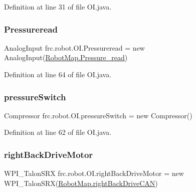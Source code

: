 Definition at line 31 of file O\+I.\+java.

\mbox{\label{classfrc_1_1robot_1_1_o_i_a763d5acad9b29d4b29b0fff838059571}} 
\subsubsection{\texorpdfstring{Pressureread}{Pressureread}}
{\footnotesize\ttfamily Analog\+Input frc.\+robot.\+O\+I.\+Pressureread = new Analog\+Input(\hyperlink{classfrc_1_1robot_1_1_robot_map_a10cc39db919c29133e2bc774281804b0}{Robot\+Map.\+Pressure\+\_\+read})\hspace{0.3cm}{\ttfamily [static]}}



Definition at line 64 of file O\+I.\+java.

\mbox{\label{classfrc_1_1robot_1_1_o_i_a68157a4a30cc0fae8bc36ae0ac999c82}} 
\subsubsection{\texorpdfstring{pressure\+Switch}{pressureSwitch}}
{\footnotesize\ttfamily Compressor frc.\+robot.\+O\+I.\+pressure\+Switch = new Compressor()\hspace{0.3cm}{\ttfamily [static]}}



Definition at line 62 of file O\+I.\+java.

\mbox{\label{classfrc_1_1robot_1_1_o_i_a5f2937beffdc7dd1d937aaff36f20c1e}} 
\subsubsection{\texorpdfstring{right\+Back\+Drive\+Motor}{rightBackDriveMotor}}
{\footnotesize\ttfamily W\+P\+I\+\_\+\+Talon\+S\+RX frc.\+robot.\+O\+I.\+right\+Back\+Drive\+Motor = new W\+P\+I\+\_\+\+Talon\+S\+RX(\hyperlink{classfrc_1_1robot_1_1_robot_map_a0fb2fff6bf26e3f196d1cb02a89072c3}{Robot\+Map.\+right\+Back\+Drive\+C\+AN})\hspace{0.3cm}{\ttfamily [static]}}



